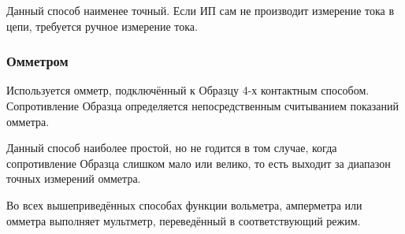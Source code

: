 Данный способ наименее точный. Если ИП сам не производит измерение тока в цепи, требуется ручное измерение тока.

\subsubsection{Омметром}

Используется омметр, подключённый к Образцу 4-х контактным способом. Сопротивление Образца определяется непосредственным считыванием показаний омметра.

Данный способ наиболее простой, но не годится в том случае, когда сопротивление Образца слишком мало или велико, то есть выходит за диапазон точных измерений омметра.

\bigskip 

Во всех вышеприведённых способах функции вольметра, амперметра или омметра выполняет мультметр, переведённый в соответствующий режим.
